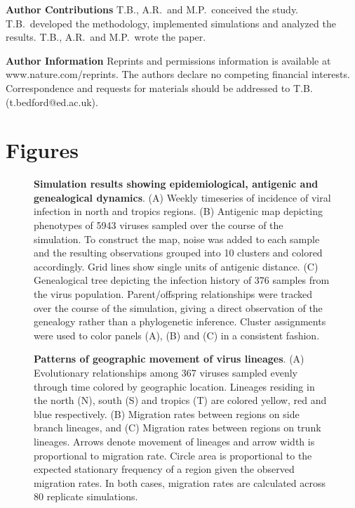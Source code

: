 \noindent \textbf{Author Contributions} T.B., A.R.\ and M.P.\ conceived the study.  T.B.\ developed the methodology, implemented simulations and analyzed the results.  T.B., A.R.\ and M.P.\ wrote the paper.

\vspace{0.3cm}

\noindent \textbf{Author Information} Reprints and permissions information is available at www.nature.com/reprints. The authors declare no competing financial interests. Correspondence and requests for materials should be addressed to T.B. (t.bedford@ed.ac.uk).

\section*{Figures}

\begin{figure}[H]
	\centering
	\caption{\textbf{Simulation results showing epidemiological, antigenic and genealogical dynamics}. (A) Weekly timeseries of incidence of viral infection in north and tropics regions. (B) Antigenic map depicting phenotypes of 5943 viruses sampled over the course of the simulation.  To construct the map, noise was added to each sample and the resulting observations grouped into 10 clusters and colored accordingly.  Grid lines show single units of antigenic distance. (C) Genealogical tree depicting the infection history of 376 samples from the virus population.  Parent/offspring relationships were tracked over the course of the simulation, giving a direct observation of the genealogy rather than a phylogenetic inference. Cluster assignments were used to color panels (A), (B) and (C) in a consistent fashion.}
	\label{incmaptree}
\end{figure}

\begin{figure}[H]
	\centering
	\caption{\textbf{Patterns of geographic movement of virus lineages}. (A) Evolutionary relationships among 367 viruses sampled evenly through time colored by geographic location. Lineages residing in the north (N), south (S) and tropics (T) are colored yellow, red and blue respectively. (B) Migration rates between regions on side branch lineages, and (C) Migration rates between regions on trunk lineages. Arrows denote movement of lineages and arrow width is proportional to migration rate. Circle area is proportional to the expected stationary frequency of a region given the observed migration rates.  In both cases, migration rates are calculated across 80 replicate simulations.}
	\label{spatial}
\end{figure}

